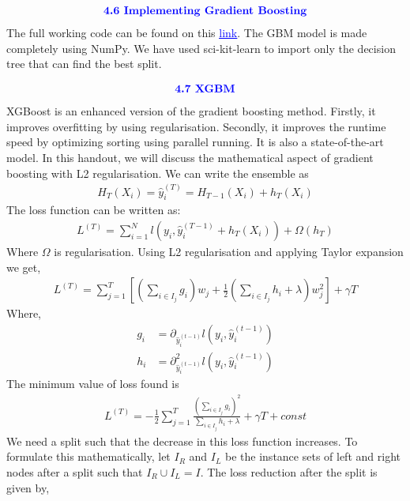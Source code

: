 \documentclass{homework}
\begin{document}
 \begin{align*}
    \textcolor{blue}{ \text{{\textbf{4.6 Implementing Gradient Boosting}}}}
 \end{align*}
 The full working code can be found on this \href{https://github.com/Anshul-Sangrame/Handouts-2022-2023/blob/main/Boosting%20and%20bagging/code/Gradient%20boosting/main.ipynb}{\textcolor{blue}{\underline{link}}}. The GBM model is made completely using NumPy. We have used sci-kit-learn to import only the decision tree that can find the best split.
 

 \begin{align*}
    \textcolor{blue}{ \text{{\textbf{4.7 XGBM}}}}
 \end{align*}
 XGBoost is an enhanced version of the gradient boosting method. Firstly, it improves overfitting by using regularisation. Secondly, it improves the runtime speed by optimizing sorting using parallel running. It is also a state-of-the-art model. In this handout, we will discuss the mathematical aspect of gradient boosting with L2 regularisation. We can write the ensemble as
 \begin{align*}
    H_T(X_i) = \hat{y}_i^{(T)} = H_{T-1}(X_i) + h_T(X_i)
 \end{align*}
 The loss function can be written as:
 \begin{align*}
    L^{(T)} = \sum_{i=1}^{N} l(y_i,\hat{y}_i^{(T-1)} + h_T(X_i)) + \Omega(h_T)
 \end{align*}
 Where $\Omega$ is regularisation. Using L2 regularisation and applying Taylor expansion we get,
 \begin{align*}
    L^{(T)} = \sum_{j=1}^{T}\left[\left(\sum_{i \in I_j} g_i \right)w_j + \frac{1}{2} \left(\sum_{i \in I_j} h_i + \lambda \right)w_j^2 \right] + \gamma T
 \end{align*}
 Where, 
 \begin{align*}
    g_i &= \partial_{\hat{y}_i^{(t-1)}}l(y_i,\hat{y}_i^{(t-1)}) \\
    h_i &= \partial^2_{\hat{y}_i^{(t-1)}}l(y_i,\hat{y}_i^{(t-1)})
 \end{align*}
 The minimum value of loss found is
 \begin{align*}
    L^{(T)} = -\frac{1}{2}\sum_{j=1}^{T} \frac{(\sum_{i \in I_j} g_i)^2}{\sum_{i \in I_j}h_i + \lambda} + \gamma T + const
 \end{align*} 
 We need a split such that the decrease in this loss function increases. To formulate this mathematically, let $I_R$ and $I_L$ be the instance sets of left and right nodes after a split such that $I_R \cup I_L = I$. The loss reduction after the split is given by,
\end{document}
